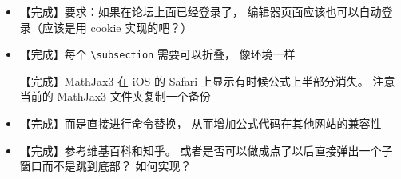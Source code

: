 \begin{itemize}
\item 【完成】要求：如果在论坛上面已经登录了， 编辑器页面应该也可以自动登录（应该是用 cookie 实现的吧？）

\item 【完成】每个 \verb`\subsection` 需要可以折叠， 像环境一样

【完成】MathJax3 在 iOS 的 Safari 上显示有时候公式上半部分消失。 注意当前的 MathJax3 文件夹复制一个备份

\item 【完成】而是直接进行命令替换， 从而增加公式代码在其他网站的兼容性

\item 【完成】参考维基百科和知乎。 或者是否可以做成点了以后直接弹出一个子窗口而不是跳到底部？ 如何实现？
\end{itemize}

